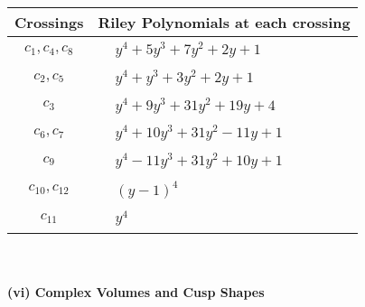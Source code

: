 \documentclass[1p]{elsarticle_modified}
\theoremstyle{definition}
\begin{document}
\begin{tabular}{m{50pt}|m{274pt}}
Crossings & \hspace{64pt}Riley Polynomials at each crossing \\
\hline $$\begin{aligned}c_{1},c_{4},c_{8}\end{aligned}$$&$\begin{aligned}
&y^4+5 y^3+7 y^2+2 y+1
\end{aligned}$\\
\hline $$\begin{aligned}c_{2},c_{5}\end{aligned}$$&$\begin{aligned}
&y^4+y^3+3 y^2+2 y+1
\end{aligned}$\\
\hline $$\begin{aligned}c_{3}\end{aligned}$$&$\begin{aligned}
&y^4+9 y^3+31 y^2+19 y+4
\end{aligned}$\\
\hline $$\begin{aligned}c_{6},c_{7}\end{aligned}$$&$\begin{aligned}
&y^4+10 y^3+31 y^2-11 y+1
\end{aligned}$\\
\hline $$\begin{aligned}c_{9}\end{aligned}$$&$\begin{aligned}
&y^4-11 y^3+31 y^2+10 y+1
\end{aligned}$\\
\hline $$\begin{aligned}c_{10},c_{12}\end{aligned}$$&$\begin{aligned}
&(y-1)^4
\end{aligned}$\\
\hline $$\begin{aligned}c_{11}\end{aligned}$$&$\begin{aligned}
&y^4
\end{aligned}$\\
\hline
\end{tabular}\\~\\
\newpage\flushleft \textbf{(vi) Complex Volumes and Cusp Shapes}
\end{document}
